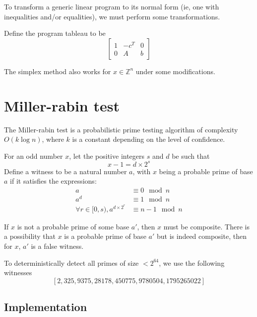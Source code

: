 \documentclass[11pt]{article}
\begin{document}
To transform a generic linear program to its normal form (ie, one with inequalities and/or equalities), we must perform some transformations.


Define the program tableau to be
\[
\begin{bmatrix}
	1 & -c^T & 0\\
	0 & A & b
\end{bmatrix}
\]


The simplex method also works for $x \in \mathbb{Z}^n$ under some modifications.









\newpage
\section{Miller-rabin test}
The Miller-rabin test is a probabilistic prime testing algorithm of complexity $O(k \log n)$, where $k$ is a constant depending on the level of confidence.

For an odd number $x$, let the positive integers $s$ and $d$ be such that
\[
    x - 1 = d \times 2^s
\]
Define a witness to be a natural number $a$, with $x$ being a probable prime of base $a$ if it satisfies the expressions:
\begin{align*}
    a &\equiv 0 \mod n\\
    a^d &\equiv 1 \mod n\\
    \forall r \in [0, s), a^{d\times 2^r} &\equiv n-1 \mod n
\end{align*}

If $x$ is not a probable prime of some base $a'$, then $x$ must be composite. There is a possibility that $x$ is a probable prime of base $a'$ but is indeed composite, then for $x$, $a'$ is a false witness.

To deterministically detect all primes of size $< 2^{64}$, we use the following witnesses
\[
    [2, 325, 9375, 28178, 450775, 9780504, 1795265022]
\]


\subsection{Implementation}
\end{document}
